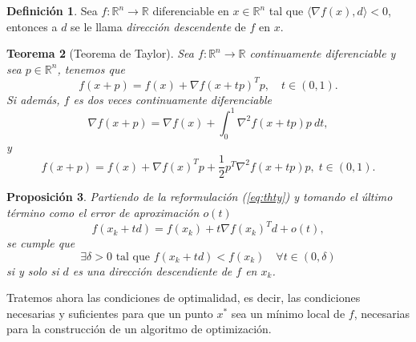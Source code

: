\documentclass[11pt,a4paper]{book}
\newtheorem{theorem}{Teorema}[chapter]
\newtheorem{proposition}[theorem]{Proposición}
\theoremstyle{definition}
\newtheorem{definition}[theorem]{Definición}
\theoremstyle{remark}
\begin{document}



\begin{definition}
	Sea $f: \mathbb{R}^n \rightarrow \mathbb{R}$ diferenciable en
$x \in \mathbb{R}^n$ tal que $\langle \nabla f(x), d \rangle < 0$, entonces a $d$ se le llama \textit{dirección descendente} de $f$ en $x$.
\end{definition}

\begin{theorem}[Teorema de Taylor] %
	
	Sea $f: \mathbb{R}^n \rightarrow \mathbb{R}$ continuamente diferenciable y sea $p \in \mathbb{R}^n$, tenemos que 
	\begin{equation}
		f(x+p) = f(x) + \nabla f(x+tp)^Tp, \quad t\in (0,1).
	\end{equation}
	Si además, $f$ es dos veces continuamente diferenciable
	\begin{equation}
		\nabla f(x+p) = \nabla f(x)
		+ \int_0^1 \nabla^2 f(x+tp)p\:dt,
	\end{equation}
	y
	\begin{equation}
		f(x+p) = f(x) + \nabla f(x)^Tp
		+ \frac{1}{2}p^T \nabla^2 f(x+tp)p, \; t\in (0,1).
		\label{eq:thty}
	\end{equation}
\end{theorem}


\begin{proposition}
Partiendo de la reformulación (\ref{eq:thty}) y tomando el último término
como el error de aproximación $o(t)$
\begin{equation}
	f(x_k + td) = f(x_k) + t \nabla f(x_k)^Td + o(t),
\end{equation}
se cumple que
\begin{equation}
	\exists \delta > 0 \text{ tal que } f(x_k + td) < f(x_k)
	\quad \forall t \in (0, \delta)
\end{equation}
si y solo si $d$ es una dirección descendiente de $f$ en $x_k$.

\end{proposition}

Tratemos ahora las condiciones de optimalidad, es decir, las condiciones necesarias y suficientes para que un punto $x^*$ sea un mínimo local de $f$, necesarias para la
construcción de un algoritmo de optimización.
\end{document}

